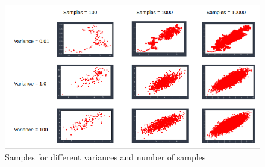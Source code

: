 \documentclass{article}
\begin{document}
\begin{figure}[h!]
\begin{center}
\includegraphics[scale=0.65]{plots_mh.png}
\caption{Samples for different variances and number of samples}
\label{mh}
\end{center}
\end{figure}
\end{document}
